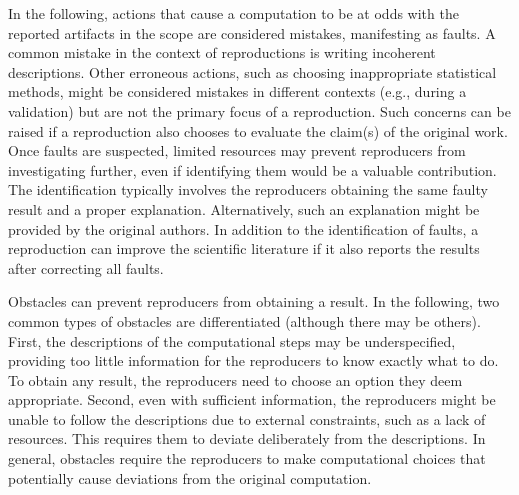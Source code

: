 \documentclass[authordate, meta]{jote-new-article}
\begin{document}
	In the following, actions that cause a computation to be at odds with the reported artifacts in the scope are considered mistakes, manifesting as faults. A common mistake in the context of reproductions is writing incoherent descriptions. Other erroneous actions, such as choosing inappropriate statistical methods, might be considered mistakes in different contexts (e.g., during a validation) but are not the primary focus of a reproduction. Such concerns can be raised if a reproduction also chooses to evaluate the claim(s) of the original work. Once faults are suspected, limited resources may prevent reproducers from investigating further, even if identifying them would be a valuable contribution. The identification typically involves the reproducers obtaining the same faulty result and a proper explanation. Alternatively, such an explanation might be provided by the original authors. In addition to the identification of faults, a reproduction can improve the scientific literature if it also reports the results after correcting all faults.



	Obstacles can prevent reproducers from obtaining a result. In the following, two common types of obstacles are differentiated (although there may be others). First, the descriptions of the computational steps may be underspecified, providing too little information for the reproducers to know exactly what to do. To obtain any result, the reproducers need to choose an option they deem appropriate. Second, even with sufficient information, the reproducers might be unable to follow the descriptions due to external constraints, such as a lack of resources. This requires them to deviate deliberately from the descriptions. In general, obstacles require the reproducers to make computational choices that potentially cause deviations from the original computation.
\end{document}

